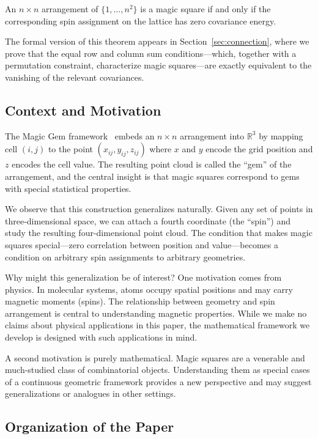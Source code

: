 \begin{theorem}
An $n \times n$ arrangement of $\{1, \ldots, n^2\}$ is a magic square if and only if the corresponding spin assignment on the lattice has zero covariance energy.
\end{theorem}

The formal version of this theorem appears in Section~\ref{sec:connection}, where we prove that the equal row and column sum conditions---which, together with a permutation constraint, characterize magic squares---are exactly equivalent to the vanishing of the relevant covariances.

\subsection{Context and Motivation}

The Magic Gem framework~\cite{magic_gems_2025} embeds an $n \times n$ arrangement into $\mathbb{R}^3$ by mapping cell $(i,j)$ to the point $(x_{ij}, y_{ij}, z_{ij})$ where $x$ and $y$ encode the grid position and $z$ encodes the cell value. The resulting point cloud is called the ``gem'' of the arrangement, and the central insight is that magic squares correspond to gems with special statistical properties.

We observe that this construction generalizes naturally. Given any set of points in three-dimensional space, we can attach a fourth coordinate (the ``spin'') and study the resulting four-dimensional point cloud. The condition that makes magic squares special---zero correlation between position and value---becomes a condition on arbitrary spin assignments to arbitrary geometries.

Why might this generalization be of interest? One motivation comes from physics. In molecular systems, atoms occupy spatial positions and may carry magnetic moments (spins). The relationship between geometry and spin arrangement is central to understanding magnetic properties. While we make no claims about physical applications in this paper, the mathematical framework we develop is designed with such applications in mind.

A second motivation is purely mathematical. Magic squares are a venerable and much-studied class of combinatorial objects. Understanding them as special cases of a continuous geometric framework provides a new perspective and may suggest generalizations or analogues in other settings.

\subsection{Organization of the Paper}

